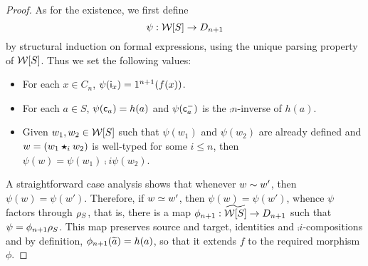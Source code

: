 \begin{proof}
  As for the existence, we first define
  \[\psi:\mathcal{W}[S]\to D_{n+1}\]
  by structural induction on formal expressions, using the unique
  parsing property of
  $\mathcal{W}[S]$. Thus we set the
  following values:
  \begin{itemize}
  \item For each $x\in C_n$, $\psi(\mathsf{i}_{x})=1^{n+1}(f(x))$.
  \item For each $a\in S$, $\psi(\mathsf{c}_{a})=h(a)$ and $\psi(\mathsf{c}^{-}_{a})$ is
    the $\comp n$-inverse of $h(a)$.
  \item Given $w_1,w_2\in \mathcal{W}[S]$ such that $\psi(w_1)$ and
    $\psi(w_2)$ are already defined and $w=(w_1\bm{\star}_{i} w_2)$ is
    well-typed for some $i\leq n$, then $\psi(w)=\psi(w_1)\comp
    i\psi(w_2)$.
  \end{itemize}
  A straightforward case analysis shows that whenever $w\sim w'$,
  then $\psi(w)=\psi(w')$. Therefore, if $w\simeq w'$, then
  $\psi(w)=\psi(w')$, whence $\psi$ factors through $\rho_{S}$, that
  is, there is a map $\phi_{n+1}:\widetilde{\mathcal{W}[S]}\to D_{n+1}$ such that
  $\psi=\phi_{n+1}\rho_{S}$. This map preserves source and target,
  identities and $\comp i$-compositions and by definition, $\phi_{n+1}(\widetilde{a})=h(a)$, so that it extends $f$ to the required morphism $\phi$. 
\end{proof}
